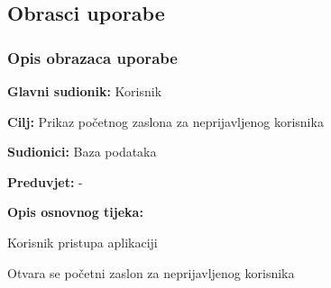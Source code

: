 			\eject 
			
			
				
			\subsection{Obrasci uporabe}
		
				\subsubsection{Opis obrazaca uporabe}
				
					\noindent {}
					\begin{packed_item}
						
						\item \textbf{Glavni sudionik: }Korisnik
						\item  \textbf{Cilj:} Prikaz početnog zaslona za neprijavljenog korisnika
						\item  \textbf{Sudionici:} Baza podataka
						\item  \textbf{Preduvjet:} -
						\item  \textbf{Opis osnovnog tijeka:}
						
						\item[] \begin{packed_enum}
							
							\item Korisnik pristupa aplikaciji
							\item Otvara se početni zaslon za neprijavljenog korisnika
						\end{packed_enum}
					\end{packed_item}
					
